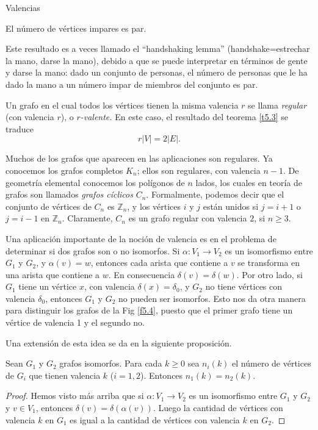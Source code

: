 \begin{section}{Valencias}
\begin{teorema} El número de vértices impares es par.
\end{teorema}

Este resultado es a veces llamado el ``handshaking lemma''
(handshake=estrechar la mano, darse la  
mano), debido a que se puede interpretar en términos de gente y
darse la mano: dado un conjunto de personas, el número de personas
que le ha dado la mano a un número impar de miembros del conjunto
es par.

Un grafo en el cual todos los vértices tienen la misma valencia
$r$ se llama {\em regular}   (con valencia
$r$), o {\em $r$-valente.} En este caso, el resultado del teorema
\ref{t5.3} se traduce
$$
r|V|=2|E|.
$$

Muchos de los grafos que aparecen en las aplicaciones son
regulares. Ya conocemos los  grafos completos $K_n$; ellos son
regulares, con valencia $n-1$. De geometría elemental conocemos
los polígonos de $n$ lados, los cuales en teoría de grafos son
llamados {\em {grafos cíclicos}}   $C_n$.
Formalmente, podemos decir que el conjunto de vértices de $C_n$ es
$\mathbb Z_n$, y los vértices $i$ y $j$ están unidos si $j=i+1$ o
$j=i-1$ en $\mathbb Z_n$. Claramente, $C_n$ es un grafo regular
con valencia $2$, si $n\ge 3$.

Una aplicación importante de la noción de valencia es en el
problema de determinar si dos grafos son o no isomorfos. Si
$\alpha:V_1 \to  V_2$ es un isomorfismo entre $G_1$ y $G_2$, y
$\alpha(v)=w$, entonces cada arista que contiene a $v$ se
transforma en una arista que contiene a $w$. En consecuencia
$\delta(v)=\delta(w)$. Por otro lado, si $G_1$ tiene un vértice
$x$, con valencia $\delta(x)=\delta_0$, y $G_2$ no tiene vértices
con valencia $\delta_0$, entonces $G_1$ y $G_2$ no pueden ser
isomorfos. Esto nos da otra manera para distinguir los grafos de
la Fig \ref{f5.4}, puesto que el primer grafo tiene un vértice de
valencia 1 y el segundo no.

Una extensión de esta idea se da en la siguiente proposición.


\begin{proposicion}\label{criterioiso}Sean  $G_1$ y $G_2$ grafos isomorfos. Para cada $k\ge 0$ sea $n_i(k)$ el
número de vértices de $G_i$ que tienen valencia $k$ ($i=1,2$).
Entonces $n_1(k)=n_2(k)$.
\end{proposicion}
\begin{proof} Hemos visto más arriba que si $\alpha:V_1 \to  V_2$ es un isomorfismo entre $G_1$ y $G_2$ y $v\in V_1$, entonces $\delta(v)=\delta(\alpha(v))$. Luego la cantidad de vértices con valencia $k$ en $G_1$ es igual  a la cantidad de vértices con valencia $k$ en $G_2$.     
\end{proof}


\end{section}
